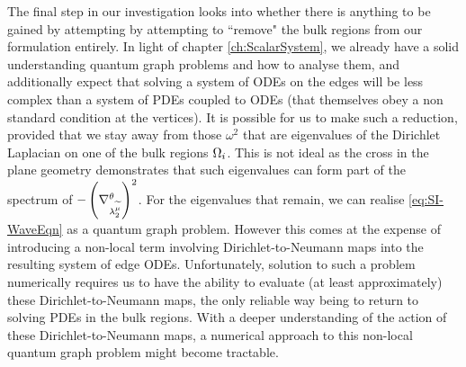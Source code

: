 The final step in our investigation looks into whether there is anything to be gained by attempting by attempting to ``remove" the bulk regions from our formulation entirely.
In light of chapter \ref{ch:ScalarSystem}, we already have a solid understanding quantum graph problems and how to analyse them, and additionally expect that solving a system of ODEs on the edges will be less complex than a system of PDEs coupled to ODEs (that themselves obey a non standard condition at the vertices).
It is possible for us to make such a reduction, provided that we stay away from those $\omega^2$ that are eigenvalues of the Dirichlet Laplacian on one of the bulk regions $\Omega_i$.
This is not ideal as the cross in the plane geometry demonstrates that such eigenvalues can form part of the spectrum of $-\left( \nabla^{\theta}_{\lambda_2^{\widetilde{\mu}}} \right)^2$.
For the eigenvalues that remain, we can realise \eqref{eq:SI-WaveEqn} as a quantum graph problem.
However this comes at the expense of introducing a non-local term involving Dirichlet-to-Neumann maps into the resulting system of edge ODEs.
Unfortunately, solution to such a problem numerically requires us to have the ability to evaluate (at least approximately) these Dirichlet-to-Neumann maps, the only reliable way being to return to solving PDEs in the bulk regions.
With a deeper understanding of the action of these Dirichlet-to-Neumann maps, a numerical approach to this non-local quantum graph problem might become tractable.

